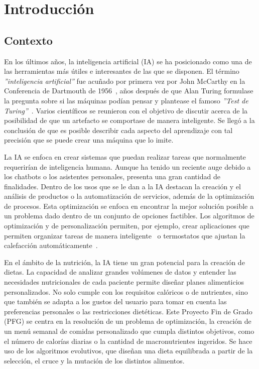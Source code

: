 \chapter{Introducción}
\label{ch:introduccion}

\section{Contexto}
En los últimos años, la inteligencia artificial (IA) se ha posicionado como una de las herramientas más útiles e interesantes de las que se disponen. El término \textit{''inteligencia artificial''} fue acuñado por primera vez por John McCarthy en la Conferencia de Dartmouth de 1956~\cite{dartmouth1956}, años después de que Alan Turing formulase la pregunta sobre si las máquinas podían pensar y plantease el famoso \textit{''Test de Turing''}~\cite{turing1950}. Varios científicos se reunieron con el objetivo de discutir acerca de la posibilidad de que un artefacto se comportase de manera inteligente. Se llegó a la conclusión de que es posible describir cada aspecto del aprendizaje con tal precisión que se puede crear una máquina que lo imite.

La IA se enfoca en crear sistemas que puedan realizar tareas que normalmente requerirían de inteligencia humana. Aunque ha tenido un reciente auge debido a los chatbots o los asistentes personales, presenta una gran cantidad de finalidades. Dentro de los usos que se le dan a la IA destacan la creación y el análisis de productos o la automatización de servicios, además de la optimización de procesos. Esta optimización se enfoca en encontrar la mejor solución posible a un problema dado dentro de un conjunto de opciones factibles. Los algoritmos de optimización y de personalización permiten, por ejemplo, crear aplicaciones que permiten organizar tareas de manera inteligente~\cite{todoist2024} o termostatos que ajustan la calefacción automáticamente~\cite{googlenest2020}.

En el ámbito de la nutrición, la IA tiene un gran potencial para la creación de dietas. La capacidad de analizar grandes volúmenes de datos y entender las necesidades nutricionales de cada paciente permite diseñar planes alimenticios personalizados. No solo cumple con los requisitos calóricos o de nutrientes, sino que también se adapta a los gustos del usuario para tomar en cuenta las preferencias personales o las restricciones dietéticas.
\newpage
Este Proyecto Fin de Grado (PFG) se centra en la resolución de un problema de optimización, la creación de un menú semanal de comidas personalizado que cumpla distintos objetivos, como el número de calorías diarias o la cantidad de macronutrientes ingeridos. Se hace uso de los algoritmos evolutivos, que diseñan una dieta equilibrada a partir de la selección, el cruce y la mutación de los distintos alimentos.

